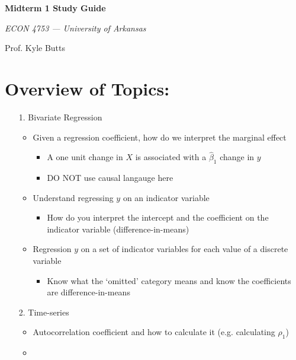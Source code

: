 \documentclass[12pt]{article}
\begin{document}
\begin{center}
  {\Huge\bf Midterm 1 Study Guide}
  
  \smallskip
  {\large\it  ECON 4753 — University of Arkansas}

  \medskip
  {\large Prof. Kyle Butts}
\end{center}

\section*{Overview of Topics:}
\begin{enumerate}
  
  \item[1.] Bivariate Regression
  \begin{itemize}    
    \item Given a regression coefficient, how do we interpret the marginal effect
    \begin{itemize}
      \item A one unit change in $X$ is associated with a $\hat{\beta}_1$ change in $y$
      \item DO NOT use causal langauge here
    \end{itemize}

    \item Understand regressing $y$ on an indicator variable
    \begin{itemize}
      \item How do you interpret the intercept and the coefficient on the indicator variable (difference-in-means)
    \end{itemize}

    \item Regression $y$ on a set of indicator variables for each value of a discrete variable
    \begin{itemize}
      \item Know what the `omitted' category means and know the coefficients are difference-in-means
    \end{itemize}
  \end{itemize}
  
  \item[2.] Time-series
  \begin{itemize}
    \item Autocorrelation coefficient and how to calculate it (e.g. calculating $\rho_1$)
    
    \item 
  \end{itemize}


\end{enumerate}
\end{document}
